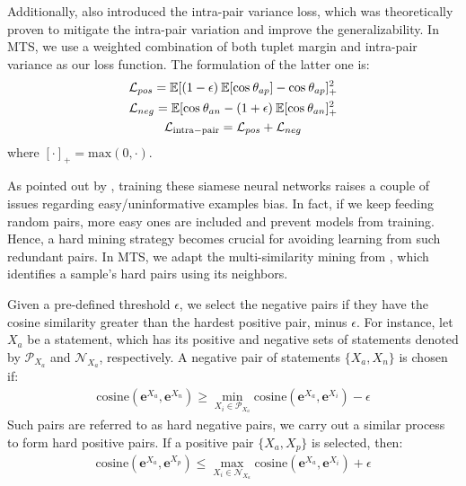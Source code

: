 Additionally, \citet{yu2019deep} also introduced the intra-pair variance loss, which was theoretically proven to mitigate the intra-pair variation and improve the generalizability. In MTS, we use a weighted combination of both tuplet margin and intra-pair variance as our loss function. The formulation of the latter one is:
\begin{align*}
\mathcal{L}_{pos} = \mathbb{E}[(1-\epsilon)\:\mathbb{E}[\mathrm{cos}\:\theta_{ap}] - \mathrm{cos}\:\theta_{ap}]^2_+ \\
\mathcal{L}_{neg} = \mathbb{E}[\mathrm{cos}\:\theta_{an} - (1+\epsilon)\:\mathbb{E}[\mathrm{cos}\:\theta_{an}]^2_+ \\
\mathcal{L}_{\mathrm{intra-pair}} = \mathcal{L}_{pos} + \mathcal{L}_{neg} \hspace*{10mm}
\end{align*}
where $[\cdot]_+ = \mathrm{max}(0, \cdot )$.

As pointed out by \citet{hermans2017defense, wu2017sampling}, training these siamese neural networks raises a couple of issues regarding easy/uninformative examples bias. In fact, if we keep feeding random pairs, more easy ones are included and prevent models from training. Hence, a hard mining strategy becomes crucial for avoiding learning from such redundant pairs. In MTS, we adapt the multi-similarity mining from \citet{wang2019multi}, which identifies a sample's hard pairs using its neighbors.

Given a pre-defined threshold $\epsilon$, we select the negative pairs if they have the cosine similarity greater than the hardest positive pair, minus $\epsilon$. For instance, let $X_a$ be a statement, which has its positive and negative sets of statements denoted by $\mathcal{P}_{X_a}$ and $\mathcal{N}_{X_a}$, respectively.
A negative pair of statements $\{X_a, X_n\}$ is chosen if:
\begin{align*}
\mathrm{cosine}(\mathbf{e}^{X_a}, \mathbf{e}^{X_n}) \geq \underset{X_i\in \mathcal{P}_{X_a}}\min \mathrm{cosine}(\mathbf{e}^{X_a}, \mathbf{e}^{X_i})-\epsilon
\end{align*}
Such pairs are referred to as hard negative pairs, we carry out a similar process to form hard positive pairs. If a positive pair $\{X_a, X_p\}$ is selected, then:
\begin{align*}
\mathrm{cosine}(\mathbf{e}^{X_a}, \mathbf{e}^{X_p}) \leq \underset{X_i\in \mathcal{N}_{X_a}}{\max}   \mathrm{cosine}(\mathbf{e}^{X_a}, \mathbf{e}^{X_i})+\epsilon
\end{align*}
